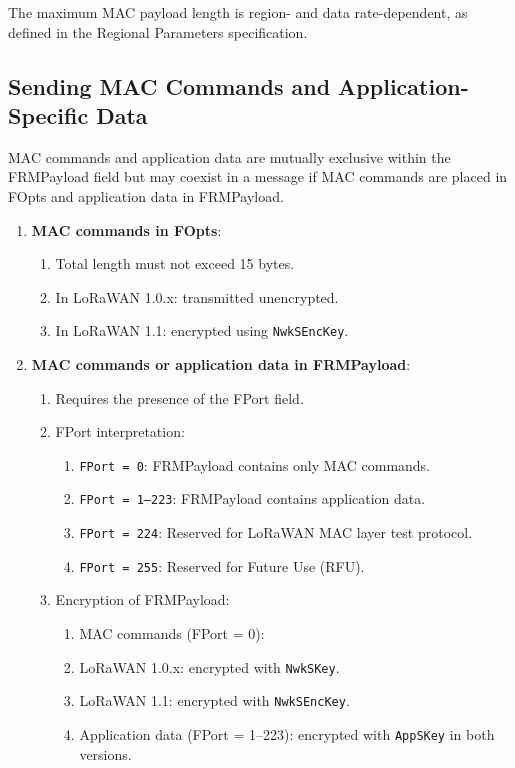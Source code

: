 The maximum MAC payload length is region- and data rate-dependent, as defined in the Regional Parameters specification.

\subsection{Sending MAC Commands and Application-Specific Data}

MAC commands and application data are mutually exclusive within the FRMPayload field but may coexist in a message if MAC commands are placed in FOpts and application data in FRMPayload.

\begin{enumerate}
    \item \textbf{MAC commands in FOpts}:
          \begin{enumerate}
              \item Total length must not exceed 15 bytes.
              \item In LoRaWAN 1.0.x: transmitted unencrypted.
              \item In LoRaWAN 1.1: encrypted using \texttt{NwkSEncKey}.
          \end{enumerate}

    \item \textbf{MAC commands or application data in FRMPayload}:
          \begin{enumerate}
              \item Requires the presence of the FPort field.
              \item FPort interpretation:
                    \begin{enumerate}
                        \item \texttt{FPort = 0}: FRMPayload contains only MAC commands.
                        \item \texttt{FPort = 1–223}: FRMPayload contains application data.
                        \item \texttt{FPort = 224}: Reserved for LoRaWAN MAC layer test protocol.
                        \item \texttt{FPort = 255}: Reserved for Future Use (RFU).
                    \end{enumerate}
              \item Encryption of FRMPayload:
                    \begin{enumerate}
                        \item MAC commands (FPort = 0):
                        \item LoRaWAN 1.0.x: encrypted with \texttt{NwkSKey}.
                        \item LoRaWAN 1.1: encrypted with \texttt{NwkSEncKey}.
                        \item Application data (FPort = 1–223): encrypted with \texttt{AppSKey} in both versions.
                    \end{enumerate}
          \end{enumerate}
\end{enumerate}

